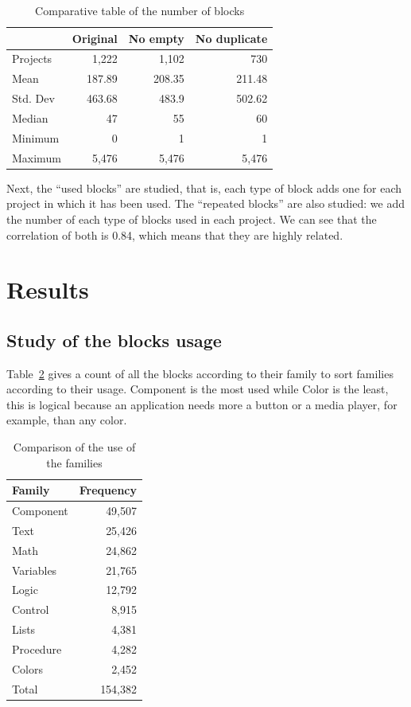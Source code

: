 \documentclass[a4paper]{article}
\begin{document}
\begin{table}
\begin{center}
\caption{Comparative table of the number of blocks}
\bigskip
\label{tab:blocks}
\begin{tabular}{|l|r|r|r|}
\hline
& Original & No empty & No duplicate \\ \hline
Projects & 1,222 & 1,102 & 730\\ \hline
Mean & 187.89 & 208.35 & 211.48\\ \hline
Std. Dev & 463.68 & 483.9 & 502.62 \\ \hline
Median & 47 & 55 & 60\\ \hline
Minimum & 0 & 1 & 1\\ \hline
Maximum & 5,476 & 5,476 & 5,476 \\ \hline
\end{tabular}
\end{center}
\end{table}

Next, the ``used blocks'' are studied, that is, each type of block adds one for each project in which it has been used. The ``repeated blocks'' are also studied: we add the number of each type of blocks used in each project. We can see that the correlation of both is 0.84, which means that they are highly related.

\section{Results}
\subsection{Study of the blocks usage}

Table~\ref{tab:block-fam-comp} gives a count of all the blocks according to their family to sort families according to their usage. Component is the most used while Color is the least, this is logical because an application needs more a button or a media player, for example, than any color.

\begin{table}
\begin{center}
\caption{Comparison of the use of the families}
\bigskip
\label{tab:block-fam-comp}
\begin{tabular}{|l|r|}
\hline
\textbf{Family} & \textbf{Frequency} \\ \hline
Component & 49,507 \\ \hline
Text	& 25,426\\ \hline
Math & 24,862\\ \hline
Variables & 21,765\\ \hline
Logic & 12,792\\ \hline
Control & 8,915\\ \hline
Lists & 4,381\\ \hline
Procedure & 4,282\\ \hline
Colors & 2,452\\ \hline
Total & 154,382\\ \hline
\end{tabular}
\end{center}
\end{table}
\end{document}
